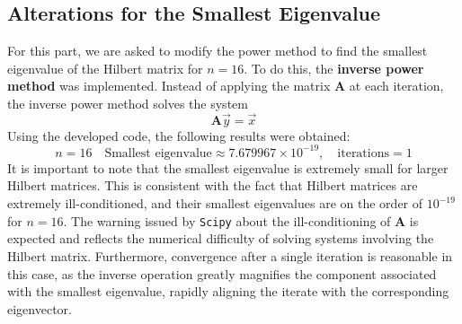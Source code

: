 \documentclass{article}
\begin{document}
\subsection{Alterations for the Smallest Eigenvalue}
For this part, we are asked to modify the power method to find the smallest eigenvalue of the Hilbert matrix for \(n=16\). To do this, the \textbf{inverse power method} was implemented. Instead of applying the matrix \(\mathbf{A}\) at each iteration, the inverse power method solves the system
\[
\mathbf{A}\Vec{y} = \Vec{x}
\]
Using the developed code, the following results were obtained:
\[
n=16 \quad \text{Smallest eigenvalue} \approx 7.679967\times10^{-19}, \quad \text{iterations} = 1
\]
It is important to note that the smallest eigenvalue is extremely small for larger Hilbert matrices. This is consistent with the fact that Hilbert matrices are extremely ill-conditioned, and their smallest eigenvalues are on the order of \(10^{-19}\) for \(n=16\). The warning issued by \texttt{Scipy} about the ill-conditioning of \(\mathbf{A}\) is expected and reflects the numerical difficulty of solving systems involving the Hilbert matrix. Furthermore, convergence after a single iteration is reasonable in this case, as the inverse operation greatly magnifies the component associated with the smallest eigenvalue, rapidly aligning the iterate with the corresponding eigenvector.
\end{document}
